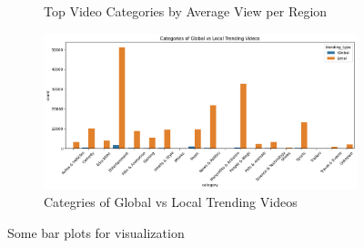 \documentclass[a4paper]{article}
\begin{document}
\begin{figure}[h]
\begin{subfigure}{0.32\textwidth}
        \caption{Top Video Categories by Average View per Region}
        \label{fig:sub3}
    \end{subfigure}
    \hfill
    \begin{subfigure}{0.32\textwidth}
        \includegraphics[width=\linewidth]{bar4.png}
        \caption{Categries of Global vs Local Trending Videos}
        \label{fig:sub4}
    \end{subfigure}
    \caption{Some bar plots for visualization}
    \label{fig:multi}
\end{figure}
\end{document}
